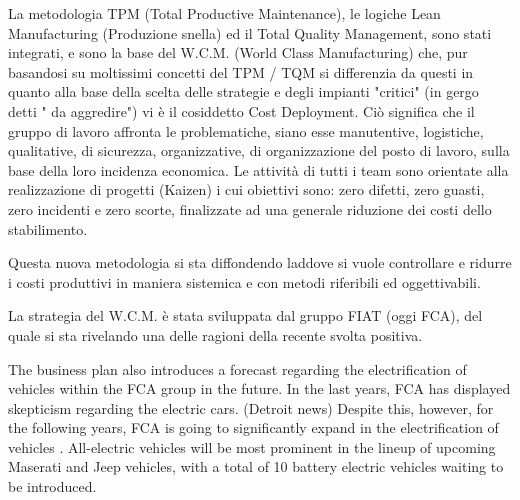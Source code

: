 La metodologia TPM (Total Productive Maintenance), le logiche Lean Manufacturing (Produzione snella) ed il Total Quality Management, sono stati integrati, e sono la base del W.C.M. (World Class Manufacturing) che, pur basandosi su moltissimi concetti del TPM / TQM si differenzia da questi in quanto alla base della scelta delle strategie e degli impianti "critici" (in gergo detti " da aggredire") vi è il cosiddetto Cost Deployment. Ciò significa che il gruppo di lavoro affronta le problematiche, siano esse manutentive, logistiche, qualitative, di sicurezza, organizzative, di organizzazione del posto di lavoro, sulla base della loro incidenza economica. Le attività di tutti i team sono orientate alla realizzazione di progetti (Kaizen) i cui obiettivi sono: zero difetti, zero guasti, zero incidenti e zero scorte, finalizzate ad una generale riduzione dei costi dello stabilimento.

Questa nuova metodologia si sta diffondendo laddove si vuole controllare e ridurre i costi produttivi in maniera sistemica e con metodi riferibili ed oggettivabili.

La strategia del W.C.M. è stata sviluppata dal gruppo FIAT (oggi FCA), del quale si sta rivelando una delle ragioni della recente svolta positiva.



The business plan also introduces a forecast regarding the electrification of vehicles within the FCA group in the future. In the last years, FCA has displayed skepticism regarding the electric cars. (Detroit news) Despite this, however, for the following years, FCA is going to significantly expand in the electrification of vehicles \cite{fca_financial_overview}. All-electric vehicles will be most prominent in the lineup of upcoming Maserati and Jeep vehicles, with a total of 10 battery electric vehicles waiting to be introduced. 




